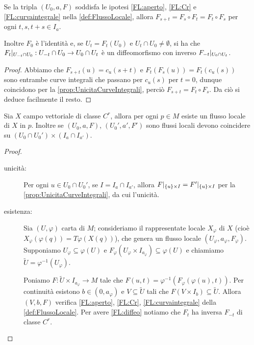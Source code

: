\begin{proposition}
	Se la tripla $(U_0,a,F)$ soddisfa le ipotesi \ref{FL:aperto}, \ref{FL:Cr} e \ref{FL:curvaintegrale} nella \cref{def:FlussoLocale}, allora $F_{s+t}=F_s\circ F_t=F_t\circ F_s$ per ogni $t,s,t+s\in I_a$.
	
	Inoltre $F_0$ è l'identità e, se $U_t=F_t(U_0)$ e $U_t\cap U_0\ne\emptyset$, si ha che $F_t|_{U_{-t}\cap U_0}:U_{-t}\cap U_0\to U_0\cap U_t$ è un diffeomorfismo con inverso $F_{-t}|_{U_0\cap U_t}$.
\end{proposition}

\begin{proof}
	Abbiamo che $F_{s+t}(u)=c_u(s+t)$ e $F_t(F_s(u))=F_t(c_u(s))$ sono entrambe curve integrali che passano per $c_u(s)$ per $t=0$, dunque coincidono per la \cref{prop:UnicitaCurveIntegrali}, perciò $F_{s+t}=F_t\circ F_s$. Da ciò si deduce facilmente il resto.
\end{proof}


\begin{proposition}  \label{prop:EsistenzaUnicitaFlussiLocali}
	Sia $X$ campo vettoriale di classe $C^r$, allora per ogni $p\in M$ esiste un flusso locale di $X$ in $p$. Inoltre se $(U_0,a,F)$, $(U_0',a',F')$ sono flussi locali devono coincidere su $(U_0\cap U_0')\times (I_a\cap I_{a'})$.
\end{proposition}
\begin{proof}
	\begin{description}
	\item [unicità:]
	Per ogni $u\in U_0\cap U_0'$, se $I=I_a\cap I_{a'}$, allora $F|_{\{u\}\times I}=F'|_{\{u\}\times I}$ per la \cref{prop:UnicitaCurveIntegrali}, da cui l'unicità.
	
	\item [esistenza:]
	Sia $(U,\varphi)$ carta di $M$; %
	consideriamo il rappresentate locale $X_\varphi$ di $X$ (cioè $X_\varphi(\varphi(q))=T\varphi(X(q))$), che genera un flusso locale $(U_\varphi,a_\varphi,F_\varphi)$.
	Supponiamo $U_\varphi\subseteq \varphi(U)$ e $F_\varphi(U_\varphi\times I_{a_\varphi})\subseteq \varphi(U)$ e chiamiamo $\tilde U=\varphi^{-1}(U_\varphi)$.
	
	Poniamo  $F:\tilde U\times I_{a_\varphi}\to M$ tale che $F(u,t)=\varphi^{-1}(F_\varphi(\varphi(u),t))$.
	Per continuità esistono $b\in(0,a_\varphi)$ e $V\subseteq \tilde U$ tali che $F(V\times I_b)\subseteq \tilde U$. %
	Allora $(V,b,F)$ verifica \ref{FL:aperto}, \ref{FL:Cr}, \ref{FL:curvaintegrale} della \cref{def:FlussoLocale}. Per avere \ref{FL:diffeo} notiamo che $F_t$ ha inversa $F_{-t}$ di classe $C^r$.
	\end{description}
\end{proof}

